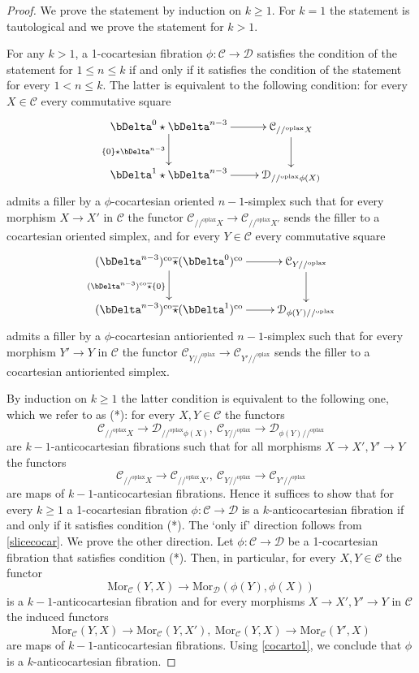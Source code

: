 \documentclass[10pt,oneside]{article}
\numberwithin{equation}{section} %
\numberwithin{figure}{section} %
\theoremstyle{plain}
\theoremstyle{definition}
\newcommand{\mC}{{\mathcal C}}
\newcommand{\mD}{{\mathcal D}}
\newcommand{\bk}{{k}}
\newcommand{\co}{\mathrm{co}}
\newcommand{\oplax}{{\mathrm{oplax}}}
\newcommand{\Mor}{{\mathrm{Mor}}}
\begin{document}
\begin{proof}
We prove the statement by induction on $ k \geq 1.$
For $\bk=1$ the statement is tautological and we prove the statement for $k >1$.

For any $k > 1 $, a 1-cocartesian fibration $\phi: \mC \to \mD$ 
satisfies the condition of the statement for $1 \leq n \leq k$ if and only if it satisfies the condition of the statement for every $1 < n \leq k$. The latter is equivalent to the following condition:
for every $X \in \mC$ every commutative square
\begin{equation}
\begin{xy}
\xymatrix{
\bDelta^0 \star \bDelta^{n-3} \ar[d]_{\{0\}\star \bDelta^{n-3}} \ar[r]
& \mC_{//^\oplax X} \ar[d]
\\ 
\bDelta^1 \star \bDelta^{n-3} \ar[r] & \mD_{//^\oplax \phi(X)}
}
\end{xy}\end{equation}
admits a filler by a $\phi$-cocartesian oriented $n-1$-simplex such that for every morphism $X \to X'$ in $\mC$
the functor $\mC_{//^\oplax X } \to \mC_{//^\oplax X'}$ sends the filler to a cocartesian oriented simplex, and for every $Y \in \mC$ every commutative square
\begin{equation}
\begin{xy}
\xymatrix{
(\bDelta^{n-3})^\co \overline{\star} (\bDelta^0)^\co \ar[d]_{(\bDelta^{n-3})^\co \overline{\star} \{0\}} \ar[r]
& \mC_{Y//^\oplax } \ar[d]
\\ 
(\bDelta^{n-3})^\co \overline{\star} (\bDelta^1)^\co \ar[r] & \mD_{\phi(Y)//^\oplax }
}
\end{xy}\end{equation}
admits a filler by a $\phi$-cocartesian antioriented $n-1$-simplex such that for every morphism $Y' \to Y$ in $\mC$
the functor $\mC_{Y //^\oplax  } \to \mC_{Y' //^\oplax }$ sends the filler to a cocartesian antioriented simplex.

By induction on $k \geq 1$ the latter condition is equivalent to the following one, which we refer to as (*): 
for every $X,Y \in \mC$ the functors $$\mC_{//^\oplax X} \to \mD_{//^\oplax \phi(X)}, \ \mC_{Y//^\oplax } \to \mD_{\phi(Y)//^\oplax } $$ are $k-1$-anticocartesian fibrations such that for all morphisms $X \to X', Y' \to Y $ the functors
$$\mC_{//^\oplax X } \to \mC_{//^\oplax X'}, \ \mC_{Y //^\oplax } \to \mC_{Y' //^\oplax } $$ are maps of $k-1$-anticocartesian fibrations.
Hence it suffices to show that for every $k \geq 1$ a 1-cocartesian fibration $\phi:\mC \to \mD$ is a $k$-anticocartesian fibration if and only if it satisfies condition (*).
The `only if' direction follows from \cref{slicecocar}. We prove the other direction.
Let $\phi:\mC \to \mD$ be a 1-cocartesian fibration that satisfies condition (*).
Then, in particular, for every $X,Y \in \mC$ the functor 
$$\Mor_\mC(Y,X) \to \Mor_\mD(\phi(Y), \phi(X)) $$ is a $k-1$-anticocartesian fibration and for every morphisms $X \to X', Y' \to Y $ in $\mC$ the induced functors
$$\Mor_\mC(Y,X) \to \Mor_\mC(Y,X'), \ \Mor_\mC(Y,X) \to \Mor_\mC(Y',X) $$ 
are maps of $k-1$-anticocartesian fibrations.
Using \cref{cocarto1}, we conclude that $\phi$ is a $k$-anticocartesian fibration. 




\end{proof}
\end{document}
